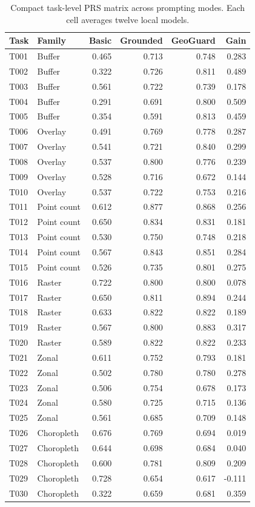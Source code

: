 \begin{table}[htbp]
\centering
\caption{Compact task-level PRS matrix across prompting modes. Each cell averages twelve local models.}
\label{tab:task-prs-matrix}
\small
\setlength{\tabcolsep}{4pt}
\begin{tabular}{llrrrr}
\toprule
Task & Family & Basic & Grounded & GeoGuard & Gain \\
\midrule
T001 & Buffer & 0.465 & 0.713 & 0.748 & 0.283 \\
T002 & Buffer & 0.322 & 0.726 & 0.811 & 0.489 \\
T003 & Buffer & 0.561 & 0.722 & 0.739 & 0.178 \\
T004 & Buffer & 0.291 & 0.691 & 0.800 & 0.509 \\
T005 & Buffer & 0.354 & 0.591 & 0.813 & 0.459 \\
T006 & Overlay & 0.491 & 0.769 & 0.778 & 0.287 \\
T007 & Overlay & 0.541 & 0.721 & 0.840 & 0.299 \\
T008 & Overlay & 0.537 & 0.800 & 0.776 & 0.239 \\
T009 & Overlay & 0.528 & 0.716 & 0.672 & 0.144 \\
T010 & Overlay & 0.537 & 0.722 & 0.753 & 0.216 \\
T011 & Point count & 0.612 & 0.877 & 0.868 & 0.256 \\
T012 & Point count & 0.650 & 0.834 & 0.831 & 0.181 \\
T013 & Point count & 0.530 & 0.750 & 0.748 & 0.218 \\
T014 & Point count & 0.567 & 0.843 & 0.851 & 0.284 \\
T015 & Point count & 0.526 & 0.735 & 0.801 & 0.275 \\
T016 & Raster & 0.722 & 0.800 & 0.800 & 0.078 \\
T017 & Raster & 0.650 & 0.811 & 0.894 & 0.244 \\
T018 & Raster & 0.633 & 0.822 & 0.822 & 0.189 \\
T019 & Raster & 0.567 & 0.800 & 0.883 & 0.317 \\
T020 & Raster & 0.589 & 0.822 & 0.822 & 0.233 \\
T021 & Zonal & 0.611 & 0.752 & 0.793 & 0.181 \\
T022 & Zonal & 0.502 & 0.780 & 0.780 & 0.278 \\
T023 & Zonal & 0.506 & 0.754 & 0.678 & 0.173 \\
T024 & Zonal & 0.580 & 0.725 & 0.715 & 0.136 \\
T025 & Zonal & 0.561 & 0.685 & 0.709 & 0.148 \\
T026 & Choropleth & 0.676 & 0.769 & 0.694 & 0.019 \\
T027 & Choropleth & 0.644 & 0.698 & 0.684 & 0.040 \\
T028 & Choropleth & 0.600 & 0.781 & 0.809 & 0.209 \\
T029 & Choropleth & 0.728 & 0.654 & 0.617 & -0.111 \\
T030 & Choropleth & 0.322 & 0.659 & 0.681 & 0.359 \\
\bottomrule
\end{tabular}
\end{table}
